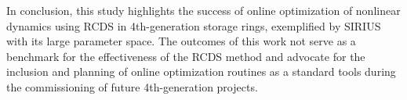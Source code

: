 In conclusion, this study highlights the success of online optimization of nonlinear dynamics using RCDS in 4th-generation storage rings, exemplified by SIRIUS with its large parameter space. The outcomes of this work not serve as a benchmark for the effectiveness of the RCDS method and advocate for the inclusion and planning of online optimization routines as a standard tools during the commissioning of future 4th-generation projects.

